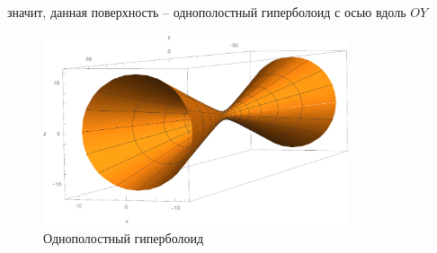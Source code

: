 \documentclass[12pt,a4paper]{article}
\begin{document}
    \noindent значит, данная поверхность -- однополостный гиперболоид с осью вдоль $ OY $

    \begin{figure}[!h]
        \includegraphics[width=0.8\textwidth]{Hyp.pdf}
        \caption{Однополостный гиперболоид}
        \label{fig:hyp}
    \end{figure}
\end{document}
